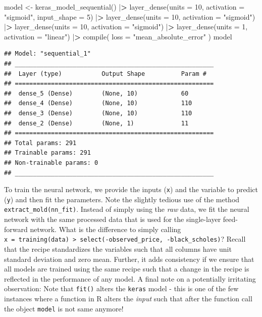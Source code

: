 \documentclass[
]{krantz}
\newenvironment{Shaded}{\begin{snugshade}}{\end{snugshade}}
\newcommand{\AttributeTok}[1]{\textcolor[rgb]{0.61,0.61,0.61}{#1}}
\newcommand{\DecValTok}[1]{\textcolor[rgb]{0.06,0.06,0.06}{#1}}
\newcommand{\ErrorTok}[1]{\textcolor[rgb]{0.14,0.14,0.14}{\textbf{#1}}}
\newcommand{\FunctionTok}[1]{\textcolor[rgb]{0,0,0}{#1}}
\newcommand{\NormalTok}[1]{#1}
\newcommand{\OtherTok}[1]{\textcolor[rgb]{0.37,0.37,0.37}{#1}}
\newcommand{\SpecialCharTok}[1]{\textcolor[rgb]{0,0,0}{#1}}
\newcommand{\StringTok}[1]{\textcolor[rgb]{0.5,0.5,0.5}{#1}}
\begin{document}
\begin{Shaded}
\begin{Highlighting}[]
\NormalTok{model }\OtherTok{\textless{}{-}} \FunctionTok{keras\_model\_sequential}\NormalTok{() }\SpecialCharTok{|}\ErrorTok{\textgreater{}}
  \FunctionTok{layer\_dense}\NormalTok{(}\AttributeTok{units =} \DecValTok{10}\NormalTok{, }\AttributeTok{activation =} \StringTok{"sigmoid"}\NormalTok{, }
              \AttributeTok{input\_shape =} \DecValTok{5}\NormalTok{) }\SpecialCharTok{|}\ErrorTok{\textgreater{}}
  \FunctionTok{layer\_dense}\NormalTok{(}\AttributeTok{units =} \DecValTok{10}\NormalTok{, }\AttributeTok{activation =} \StringTok{"sigmoid"}\NormalTok{) }\SpecialCharTok{|}\ErrorTok{\textgreater{}}
  \FunctionTok{layer\_dense}\NormalTok{(}\AttributeTok{units =} \DecValTok{10}\NormalTok{, }\AttributeTok{activation =} \StringTok{"sigmoid"}\NormalTok{) }\SpecialCharTok{|}\ErrorTok{\textgreater{}}
  \FunctionTok{layer\_dense}\NormalTok{(}\AttributeTok{units =} \DecValTok{1}\NormalTok{, }\AttributeTok{activation =} \StringTok{"linear"}\NormalTok{) }\SpecialCharTok{|}\ErrorTok{\textgreater{}}
  \FunctionTok{compile}\NormalTok{(}
    \AttributeTok{loss =} \StringTok{"mean\_absolute\_error"}
\NormalTok{  )}
\NormalTok{model}
\end{Highlighting}
\end{Shaded}

\begin{verbatim}
## Model: "sequential_1"
## _______________________________________________________
##  Layer (type)           Output Shape          Param #  
## =======================================================
##  dense_5 (Dense)        (None, 10)            60       
##  dense_4 (Dense)        (None, 10)            110      
##  dense_3 (Dense)        (None, 10)            110      
##  dense_2 (Dense)        (None, 1)             11       
## =======================================================
## Total params: 291
## Trainable params: 291
## Non-trainable params: 0
## _______________________________________________________
\end{verbatim}

To train the neural network, we provide the inputs (\texttt{x}) and the variable to predict (\texttt{y}) and then fit the parameters. Note the slightly tedious use of the method \texttt{extract\_mold(nn\_fit)}. Instead of simply using the \emph{raw} data, we fit the neural network with the same processed data that is used for the single-layer feed-forward network. What is the difference to simply calling \texttt{x\ =\ training(data)\ \textbar{}\textgreater{}\ select(-observed\_price,\ -black\_scholes)}? Recall that the recipe standardizes the variables such that all columns have unit standard deviation and zero mean. Further, it adds consistency if we ensure that all models are trained using the same recipe such that a change in the recipe is reflected in the performance of any model. A final note on a potentially irritating observation: Note that \texttt{fit()} alters the \texttt{keras} model - this is one of the few instances where a function in R alters the \emph{input} such that after the function call the object \texttt{model} is not same anymore!
\end{document}
